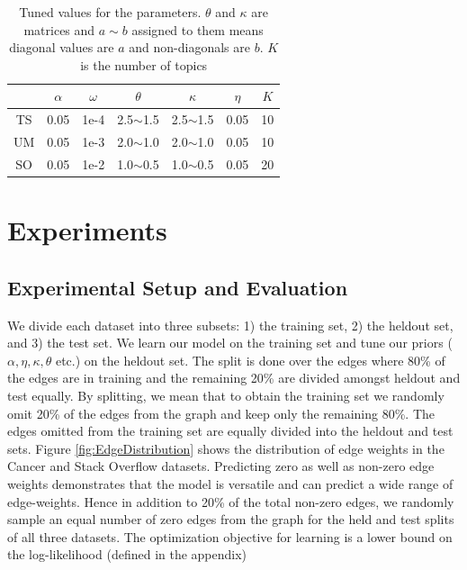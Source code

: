 \documentclass{sig-alternate}
\begin{document}
\begin{table}
\begin{center}
\begin{tabular}{c|c|c|c|c|c|c|}
 & $\alpha$ & $\omega$ & $\theta$ & $\kappa$ & $\eta$ & $K$\\\hline
 TS & 0.05 & 1e-4 & 2.5$\sim$1.5 & 2.5$\sim$1.5& 0.05 & 10\\\hline
 UM & 0.05 & 1e-3 & 2.0$\sim$1.0 & 2.0$\sim$1.0 & 0.05 & 10\\\hline
 SO & 0.05 & 1e-2 & 1.0$\sim$0.5 & 1.0$\sim$0.5 & 0.05 & 20\\\hline
\end{tabular}
\label{tab:tunedParameters}
\end{center}
\vspace*{-1\baselineskip}
\caption{Tuned values for the parameters. $\theta$ and $\kappa$ are matrices
and $a\sim b$ assigned to them means diagonal values are $a$ and non-diagonals
are $b$. $K$ is the number of topics}
\vspace*{-1\baselineskip}
\end{table}

\section{Experiments}

\subsection{Experimental Setup and Evaluation}
\label{sec:setup}
We divide each dataset into three subsets: 1) the training set, 2) the heldout set,
and 3) the test set. We learn our model on the training set and tune our priors 
($\alpha, \eta, \kappa, \theta$ etc.) on the heldout set. The split is done over the
edges where 80\% of the edges are in training and the remaining 20\% are divided amongst
heldout and test equally. By splitting, we mean that to obtain the training set we
randomly omit 20\% of the edges from the graph and keep only the remaining 80\%. The 
edges omitted from the training set are equally divided into the heldout and test sets. 
Figure \ref{fig:EdgeDistribution} shows the distribution of edge weights in
the Cancer and Stack Overflow datasets. 
Predicting zero as well as non-zero edge weights
demonstrates that the model is versatile and can predict a wide range of 
edge-weights. Hence in addition to 20\% of the total
non-zero edges, we randomly sample an equal number of zero edges from the graph for
the held and test splits of all three datasets.
The optimization objective for learning is a lower bound 
on the log-likelihood (defined in the appendix)
\end{document}
